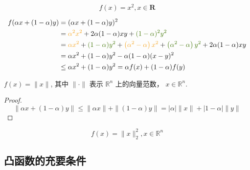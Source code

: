 \begin{example}
    \label{Example:SquareIsConvex}
    \begin{equation} f(x)=x^{2}, x \in \mathbf{R} \end{equation}

    \begin{equation}\begin{aligned}
        f(\alpha x+(1-\alpha )y) & =(\alpha x+(1-\alpha )y)^{2}\\
         & =\textcolor[rgb]{0.96,0.65,0.14}{\alpha ^{2} x^{2}} +2\alpha (1-\alpha )xy+\textcolor[rgb]{0.25,0.46,0.02}{(1-\alpha )^{2} y^{2}}\\
         & =\textcolor[rgb]{0.96,0.65,0.14}{\alpha x^{2}} +\textcolor[rgb]{0.25,0.46,0.02}{(1-\alpha )y^{2}} +\textcolor[rgb]{0.96,0.65,0.14}{\left( \alpha ^{2} -\alpha \right) x^{2}} +\textcolor[rgb]{0.25,0.46,0.02}{\left( \alpha ^{2} -\alpha \right) y^{2}} +2\alpha (1-\alpha )xy\\
         & =\alpha x^{2} +(1-\alpha )y^{2} -\alpha (1-\alpha )(x-y)^{2}\\
         & \leq \alpha x^{2} +(1-\alpha )y^{2} =\alpha f(x)+(1-\alpha )f(y)
        \end{aligned}\end{equation}
\end{example}

\begin{example}
    \label{Example:NormIsConvex}
    $ f(x)=\|x\| $, 其中 $ \|  \cdot \| $ 表示 $ \mathbb{R}^{n} $ 上的向量范数， $ x \in \mathbb{R}^{n} $.
\end{example}

\begin{proof}
    \label{Example:L2NormIsConvex}
    \begin{equation} \|\alpha x+(1-\alpha) y\| \leq\|\alpha x\|+\|(1-\alpha) y\|=|\alpha|\|x\|+|1-\alpha|\|y\| \end{equation}
\end{proof}

\begin{example}
    \begin{equation} f(x)=\|x\|_{2}^{2}, x \in \mathbb{R}^{n} \end{equation}
\end{example}

\subsection{凸函数的充要条件}

